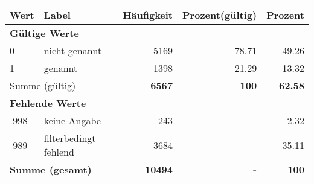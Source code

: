      \begin{longtable}{lXrrr}
     \toprule
     \textbf{Wert} & \textbf{Label} & \textbf{Häufigkeit} & \textbf{Prozent(gültig)} & \textbf{Prozent} \\
     \endhead
     \midrule
     \multicolumn{5}{l}{\textbf{Gültige Werte}}\\

     0 &
     \multicolumn{1}{X}{ nicht genannt   } &


       \num{5169} &
       \num[round-mode=places,round-precision=2]{78,71} &
         \num[round-mode=places,round-precision=2]{49,26} \\

     1 &
     \multicolumn{1}{X}{ genannt   } &


       \num{1398} &
       \num[round-mode=places,round-precision=2]{21,29} &
         \num[round-mode=places,round-precision=2]{13,32} \\
     \midrule
     \multicolumn{2}{l}{Summe (gültig)} &
       \textbf{\num{6567}} &
     \textbf{100} &
       \textbf{\num[round-mode=places,round-precision=2]{62,58}} \\
     \multicolumn{5}{l}{\textbf{Fehlende Werte}}\\
       -998 &
       keine Angabe &
         \num{243} &
        - &
         \num[round-mode=places,round-precision=2]{2,32} \\
       -989 &
       filterbedingt fehlend &
         \num{3684} &
        - &
         \num[round-mode=places,round-precision=2]{35,11} \\
     \midrule
     \multicolumn{2}{l}{\textbf{Summe (gesamt)}} &
          \textbf{\num{10494}} &
        \textbf{-} &
        \textbf{100} \\
     \bottomrule
     \end{longtable}
     
